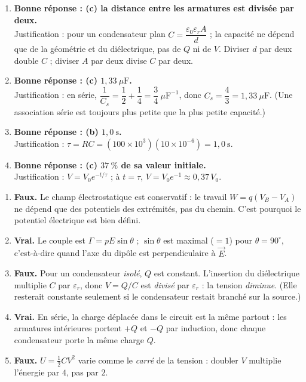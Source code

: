 \documentclass[11pt]{article}
\begin{document}
\begin{corrige}
\begin{enumerate}
\item \textbf{Bonne réponse : (c) la distance entre les armatures est divisée par deux.}\\
Justification : pour un condensateur plan $C = \dfrac{\varepsilon_0 \varepsilon_r A}{d}$ ; la capacité ne dépend que de la géométrie et du diélectrique, pas de $Q$ ni de $V$. Diviser $d$ par deux double $C$ ; diviser $A$ par deux divise $C$ par deux.
\item \textbf{Bonne réponse : (c) $1,33\ \mu\mathrm{F}$.}\\
Justification : en série, $\dfrac{1}{C_s} = \dfrac{1}{2} + \dfrac{1}{4} = \dfrac{3}{4}\ \mu\mathrm{F}^{-1}$, donc $C_s = \dfrac{4}{3} = 1,33\ \mu\mathrm{F}$. (Une association série est toujours plus petite que la plus petite capacité.)
\item \textbf{Bonne réponse : (b) $1,0\ \mathrm{s}$.}\\
Justification : $\tau = RC = (100\times10^{3})(10\times10^{-6}) = 1,0\ \mathrm{s}$.
\item \textbf{Bonne réponse : (c) $37\ \%$ de sa valeur initiale.}\\
Justification : $V = V_0 e^{-t/\tau}$ ; à $t = \tau$, $V = V_0 e^{-1} \approx 0,37\,V_0$.
\end{enumerate}
\end{corrige}

\begin{corrige}
\begin{enumerate}
\item \textbf{Faux.} Le champ électrostatique est conservatif : le travail $W = q(V_B - V_A)$ ne dépend que des potentiels des extrémités, pas du chemin. C'est pourquoi le potentiel électrique est bien défini.
\item \textbf{Vrai.} Le couple est $\Gamma = pE\sin\theta$ ; $\sin\theta$ est maximal ($=1$) pour $\theta = 90^{\circ}$, c'est-à-dire quand l'axe du dipôle est perpendiculaire à $\vec{E}$.
\item \textbf{Faux.} Pour un condensateur \emph{isolé}, $Q$ est constant. L'insertion du diélectrique multiplie $C$ par $\varepsilon_r$, donc $V = Q/C$ est \emph{divisé} par $\varepsilon_r$ : la tension \emph{diminue}. (Elle resterait constante seulement si le condensateur restait branché sur la source.)
\item \textbf{Vrai.} En série, la charge déplacée dans le circuit est la même partout : les armatures intérieures portent $+Q$ et $-Q$ par induction, donc chaque condensateur porte la même charge $Q$.
\item \textbf{Faux.} $U = \tfrac{1}{2}CV^2$ varie comme le \emph{carré} de la tension : doubler $V$ multiplie l'énergie par $4$, pas par $2$.
\end{enumerate}
\end{corrige}
\end{document}
